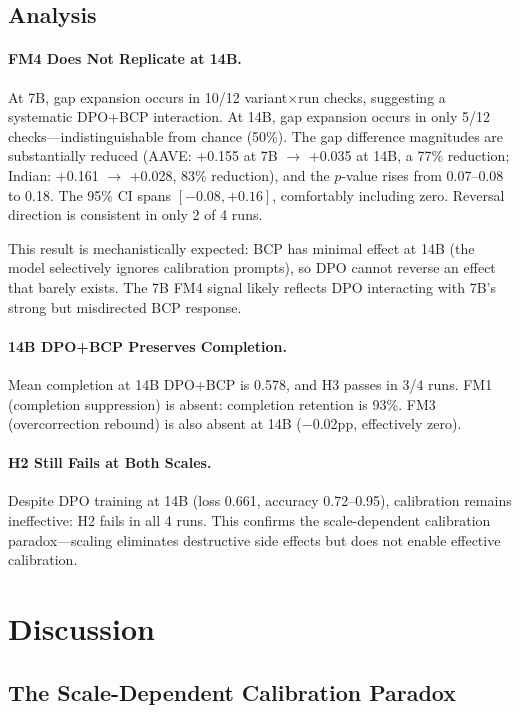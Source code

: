 \documentclass[11pt]{article}
\begin{document}
\subsection{Analysis}

\paragraph{FM4 Does Not Replicate at 14B.}
At 7B, gap expansion occurs in 10/12 variant$\times$run checks, suggesting a systematic DPO+BCP interaction.
At 14B, gap expansion occurs in only 5/12 checks---indistinguishable from chance (50\%).
The gap difference magnitudes are substantially reduced (AAVE: +0.155 at 7B $\to$ +0.035 at 14B, a 77\% reduction; Indian: +0.161 $\to$ +0.028, 83\% reduction), and the $p$-value rises from 0.07--0.08 to 0.18.
The 95\% CI spans $[-0.08, +0.16]$, comfortably including zero.
Reversal direction is consistent in only 2 of 4 runs.

This result is mechanistically expected: BCP has minimal effect at 14B (the model selectively ignores calibration prompts), so DPO cannot reverse an effect that barely exists.
The 7B FM4 signal likely reflects DPO interacting with 7B's strong but misdirected BCP response.

\paragraph{14B DPO+BCP Preserves Completion.}
Mean completion at 14B DPO+BCP is 0.578, and H3 passes in 3/4 runs.
FM1 (completion suppression) is absent: completion retention is 93\%.
FM3 (overcorrection rebound) is also absent at 14B ($-$0.02pp, effectively zero).

\paragraph{H2 Still Fails at Both Scales.}
Despite DPO training at 14B (loss 0.661, accuracy 0.72--0.95), calibration remains ineffective: H2 fails in all 4 runs.
This confirms the scale-dependent calibration paradox---scaling eliminates destructive side effects but does not enable effective calibration.

\section{Discussion}
\label{sec:discussion}

\subsection{The Scale-Dependent Calibration Paradox}
\end{document}

